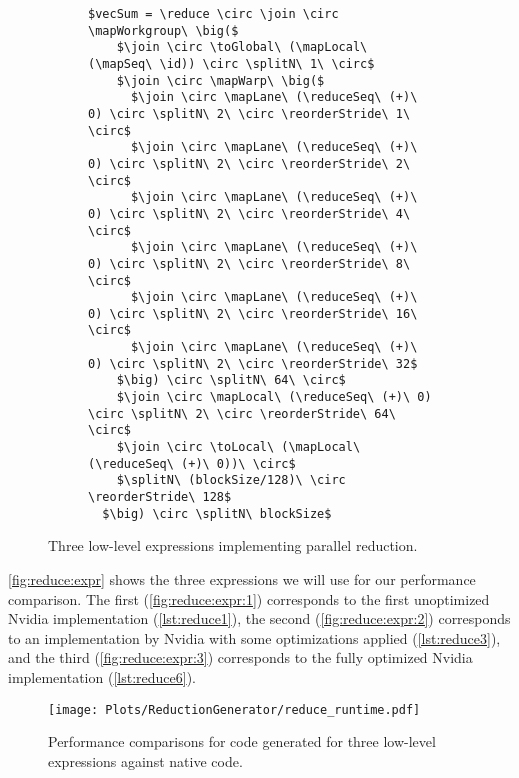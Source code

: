 \begin{figure*}[t]
\begin{subfigure}[b]{\linewidth}
\vspace{0em}
\begin{minipage}{.05\linewidth}
\caption{}
\label{fig:reduce:expr:3}
\end{minipage}
\hfill
\begin{minipage}{.9\linewidth}
\begin{lstlisting}[mathescape, basicstyle=\small\rmfamily]
$vecSum = \reduce \circ \join \circ \mapWorkgroup\ \big($
    $\join \circ \toGlobal\ (\mapLocal\ (\mapSeq\ \id)) \circ \splitN\ 1\ \circ$
    $\join \circ \mapWarp\ \big($
      $\join \circ \mapLane\ (\reduceSeq\ (+)\ 0) \circ \splitN\ 2\ \circ \reorderStride\ 1\ \circ$
      $\join \circ \mapLane\ (\reduceSeq\ (+)\ 0) \circ \splitN\ 2\ \circ \reorderStride\ 2\ \circ$
      $\join \circ \mapLane\ (\reduceSeq\ (+)\ 0) \circ \splitN\ 2\ \circ \reorderStride\ 4\ \circ$
      $\join \circ \mapLane\ (\reduceSeq\ (+)\ 0) \circ \splitN\ 2\ \circ \reorderStride\ 8\ \circ$
      $\join \circ \mapLane\ (\reduceSeq\ (+)\ 0) \circ \splitN\ 2\ \circ \reorderStride\ 16\ \circ$
      $\join \circ \mapLane\ (\reduceSeq\ (+)\ 0) \circ \splitN\ 2\ \circ \reorderStride\ 32$
    $\big) \circ \splitN\ 64\ \circ$
    $\join \circ \mapLocal\ (\reduceSeq\ (+)\ 0) \circ \splitN\ 2\ \circ \reorderStride\ 64\ \circ$
    $\join \circ \toLocal\ (\mapLocal\ (\reduceSeq\ (+)\ 0))\ \circ$
    $\splitN\ (blockSize/128)\ \circ \reorderStride\ 128$
  $\big) \circ \splitN\ blockSize$
\end{lstlisting}
\end{minipage}
\end{subfigure}

\caption{Three low-level expressions implementing parallel reduction.}
\label{fig:reduce:expr}
\end{figure*}


\autoref{fig:reduce:expr} shows the three expressions we will use for our performance comparison.
The first (\autoref{fig:reduce:expr:1}) corresponds to the first unoptimized Nvidia implementation (\autoref{lst:reduce1}),
the second (\autoref{fig:reduce:expr:2}) corresponds to an implementation by Nvidia with some optimizations applied (\autoref{lst:reduce3}), and
the third (\autoref{fig:reduce:expr:3}) corresponds to the fully optimized Nvidia implementation (\autoref{lst:reduce6}).


\begin{figure}
  \centering
  \texttt{[image: Plots/ReductionGenerator/reduce\_runtime.pdf]}
  \caption{Performance comparisons for code generated for three low-level expressions against native \OpenCL code.}
  \label{fig:reduce:expr:performance}
\end{figure}


